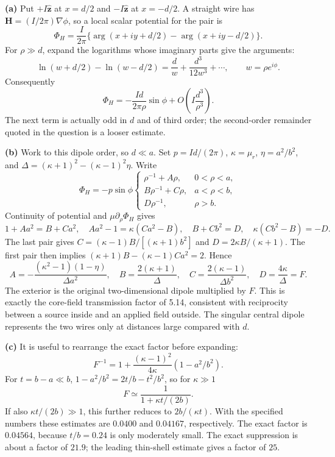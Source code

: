 \solution
\textbf{(a)} Put $+I\widehat{\mathbf z}$ at $x=d/2$ and
$-I\widehat{\mathbf z}$ at $x=-d/2$. A straight wire has
$\mathbf H=(I/2\pi)\nabla\phi$, so a local scalar potential for the pair is
\[
\Phi_H=\frac I{2\pi}\{\arg(x+iy+d/2)-\arg(x+iy-d/2)\}.
\]
For $\rho\gg d$, expand the logarithms whose imaginary parts give the
arguments:
\[
\ln(w+d/2)-\ln(w-d/2)=\frac d w+\frac{d^3}{12w^3}+\cdots,
\qquad w=\rho e^{i\phi}.
\]
Consequently
\[
\boxed{\Phi_H=-\frac{Id}{2\pi\rho}\sin\phi
+O\!\left(I\frac{d^3}{\rho^3}\right).}
\]
The next term is actually odd in $d$ and of third order; the
second-order remainder quoted in the question is a looser estimate.

\textbf{(b)} Work to this dipole order, so $d\ll a$.
Set $p=Id/(2\pi)$, $\kappa=\mu_r$, $\eta=a^2/b^2$, and
$\Delta=(\kappa+1)^2-(\kappa-1)^2\eta$. Write
\[
\Phi_H=-p\sin\phi
\begin{cases}\rho^{-1}+A\rho,&0<\rho<a,\\
B\rho^{-1}+C\rho,&a<\rho<b,\\D\rho^{-1},&\rho>b.\end{cases}
\]
Continuity of potential and $\mu\partial_\rho\Phi_H$ gives
\[
1+Aa^2=B+Ca^2,\quad Aa^2-1=\kappa(Ca^2-B),\quad
B+Cb^2=D,\quad\kappa(Cb^2-B)=-D.
\]
The last pair gives $C=(\kappa-1)B/[(\kappa+1)b^2]$ and
$D=2\kappa B/(\kappa+1)$. The first pair then implies
$(\kappa+1)B-(\kappa-1)Ca^2=2$. Hence
\[
\boxed{A=-\frac{(\kappa^2-1)(1-\eta)}{\Delta a^2},\quad
B=\frac{2(\kappa+1)}{\Delta},\quad
C=\frac{2(\kappa-1)}{\Delta b^2},\quad
D=\frac{4\kappa}{\Delta}=F.}
\]
The exterior is the original two-dimensional dipole multiplied by $F$.
This is exactly the core-field transmission factor of 5.14, consistent
with reciprocity between a source inside and an applied field outside.
The singular central dipole represents the two wires only at distances
large compared with $d$.

\textbf{(c)} It is useful to rearrange the exact factor before expanding:
\[
F^{-1}=1+\frac{(\kappa-1)^2}{4\kappa}(1-a^2/b^2).
\]
For $t=b-a\ll b$,
$1-a^2/b^2=2t/b-t^2/b^2$, so for $\kappa\gg1$
\[
\boxed{F\simeq\frac1{1+\kappa t/(2b)}.}
\]
If also $\kappa t/(2b)\gg1$, this further reduces to $2b/(\kappa t)$.
With the specified numbers these estimates are $0.0400$ and $0.04167$,
respectively. The exact factor is $0.04564$, because $t/b=0.24$
is only moderately small. The exact suppression is about a factor
of $21.9$; the leading thin-shell estimate gives a factor of $25$.


